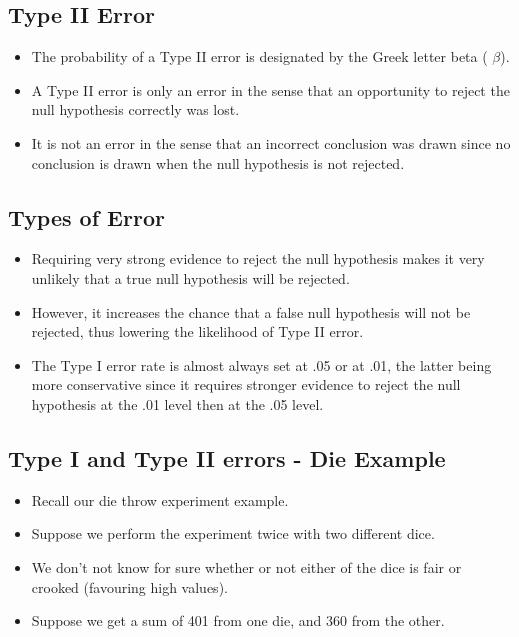 \documentclass[]{report}
\begin{document}

\subsection{Type II Error}
\begin{itemize}

\item The probability of a Type II error is designated by the Greek letter beta ( $\beta$).
\item A Type II error is only an error in the sense that an opportunity to reject the null hypothesis correctly was lost.
\item It is not an error in the sense that an incorrect conclusion was drawn since no conclusion is drawn when the null hypothesis is not rejected.
\end{itemize}



\subsection{Types of Error}

\begin{itemize}
\item
Requiring very strong evidence to reject the null hypothesis makes it very unlikely that a true null hypothesis will be rejected. \item However, it increases the chance that a false null hypothesis will not be rejected, thus lowering the likelihood of Type II error.
\item
The Type I error rate is almost always set at .05 or at .01, the latter being more conservative since it requires stronger evidence to reject the null hypothesis at the .01 level then at the .05 level.
\end{itemize}





\subsection{Type I and Type II errors - Die Example}
\begin{itemize}
\item Recall our die throw experiment example.
\item Suppose we perform the experiment twice with two different dice.
\item We don't not know for sure whether or not either of the dice is fair or crooked (favouring high values).
\item Suppose we get a sum of 401 from one die, and 360 from the other.
\end{itemize}
\end{document}
